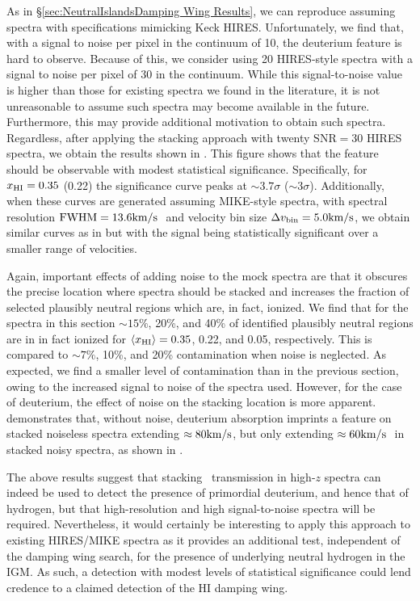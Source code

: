 As in \S\ref{sec:NeutralIslandsDamping Wing Results}, we can reproduce  assuming spectra with specifications mimicking Keck HIRES. Unfortunately, we find that, with a signal to noise per pixel in the continuum of 10, the deuterium feature is hard to observe. Because of this, we consider using 20 HIRES-style spectra with a signal to noise per pixel of 30 in the continuum. While this signal-to-noise value is higher than those for existing spectra we found in the literature, it is not unreasonable to assume such spectra may become available in the future. Furthermore, this may provide additional motivation to obtain such spectra. Regardless, after applying the stacking approach with twenty $\text{SNR} = 30$ HIRES spectra, we obtain the results shown in . This figure shows that the feature should be observable with modest statistical significance. Specifically, for $x_{\text{HI}} = 0.35$ (0.22) the significance curve peaks at $\sim 3.7\sigma$ ($\sim 3\sigma$). Additionally, when these curves are generated assuming MIKE-style spectra, with spectral resolution $\text{FWHM} = 13.6\text{km}/\text{s}\ $ and velocity bin size $\Delta v_{\text{bin}} = 5.0\text{km}/\text{s}$, we obtain similar curves as in  but with the signal being statistically significant over a smaller range of velocities. 


Again, important effects of adding noise to the mock spectra are that it obscures the precise location where spectra should be stacked and increases the fraction of selected plausibly neutral regions which are, in fact, ionized. We find that for the spectra in this section $\sim 15\%$, 20\%, and 40\% of identified plausibly neutral regions are in in fact ionized for $\langle x_{\text{HI}}\rangle = 0.35$, 0.22, and 0.05, respectively. This is compared to $\sim 7\%$, 10\%, and 20\% contamination when noise is neglected. As expected, we find a smaller level of contamination than in the previous section, owing to the increased signal to noise of the spectra used. However, for the case of deuterium, the effect of noise on the stacking location is more apparent.  demonstrates that, without noise, deuterium absorption imprints a feature on stacked noiseless spectra extending $\approx 80\text{km}/\text{s}$, but only extending $\approx 60\text{km}/\text{s}\ $ in stacked noisy spectra, as shown in .


The above results suggest that stacking \lyb\ transmission in high-$z$ spectra can indeed be used to detect the presence of primordial deuterium, and hence that of hydrogen, but that high-resolution and high signal-to-noise spectra will be required. Nevertheless, it would certainly be interesting to apply this approach to existing HIRES/MIKE spectra as it provides an additional test, independent of the damping wing search, for the presence of underlying neutral hydrogen in the IGM. As such, a detection with modest levels of statistical significance could lend credence to a claimed detection of the HI damping wing. 


